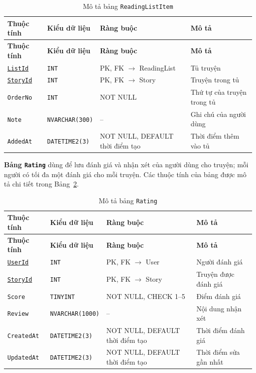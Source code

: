 {\small
\renewcommand{\arraystretch}{1.2}
\begin{longtable}{|>{\raggedright\arraybackslash}p{3.1cm}|>{\raggedright\arraybackslash}p{2.7cm}|>{\raggedright\arraybackslash}p{4.0cm}|>{\raggedright\arraybackslash}p{5.4cm}|}
\caption{Mô tả bảng \texttt{ReadingListItem}}\label{tab:db-reading-list-item}\\
\hline
\textbf{Thuộc tính} & \textbf{Kiểu dữ liệu} & \textbf{Ràng buộc} & \textbf{Mô tả} \\ \hline
\endfirsthead
\hline
\textbf{Thuộc tính} & \textbf{Kiểu dữ liệu} & \textbf{Ràng buộc} & \textbf{Mô tả} \\ \hline
\endhead
\underline{\texttt{ListId}} & \texttt{INT} & PK, FK $\rightarrow$ ReadingList & Tủ truyện \\ \hline
\underline{\texttt{StoryId}} & \texttt{INT} & PK, FK $\rightarrow$ Story & Truyện trong tủ \\ \hline
\texttt{OrderNo} & \texttt{INT} & NOT NULL & Thứ tự của truyện trong tủ \\ \hline
\texttt{Note} & \texttt{NVARCHAR(300)} & -- & Ghi chú của người dùng \\ \hline
\texttt{AddedAt} & \texttt{DATETIME2(3)} & NOT NULL, DEFAULT thời điểm tạo & Thời điểm thêm vào tủ \\ \hline
\end{longtable}
}

\textbf{Bảng \texttt{Rating}} dùng để lưu đánh giá và nhận xét của người dùng cho truyện; mỗi người có tối đa một đánh giá cho mỗi truyện. Các thuộc tính của bảng được mô tả chi tiết trong Bảng~\ref{tab:db-rating}.


{\small
\renewcommand{\arraystretch}{1.2}
\begin{longtable}{|>{\raggedright\arraybackslash}p{3.1cm}|>{\raggedright\arraybackslash}p{2.7cm}|>{\raggedright\arraybackslash}p{4.0cm}|>{\raggedright\arraybackslash}p{5.4cm}|}
\caption{Mô tả bảng \texttt{Rating}}\label{tab:db-rating}\\
\hline
\textbf{Thuộc tính} & \textbf{Kiểu dữ liệu} & \textbf{Ràng buộc} & \textbf{Mô tả} \\ \hline
\endfirsthead
\hline
\textbf{Thuộc tính} & \textbf{Kiểu dữ liệu} & \textbf{Ràng buộc} & \textbf{Mô tả} \\ \hline
\endhead
\underline{\texttt{UserId}} & \texttt{INT} & PK, FK $\rightarrow$ User & Người đánh giá \\ \hline
\underline{\texttt{StoryId}} & \texttt{INT} & PK, FK $\rightarrow$ Story & Truyện được đánh giá \\ \hline
\texttt{Score} & \texttt{TINYINT} & NOT NULL, CHECK 1--5 & Điểm đánh giá \\ \hline
\texttt{Review} & \texttt{NVARCHAR(1000)} & -- & Nội dung nhận xét \\ \hline
\texttt{CreatedAt} & \texttt{DATETIME2(3)} & NOT NULL, DEFAULT thời điểm tạo & Thời điểm đánh giá \\ \hline
\texttt{UpdatedAt} & \texttt{DATETIME2(3)} & NOT NULL, DEFAULT thời điểm tạo & Thời điểm sửa gần nhất \\ \hline
\end{longtable}
}

